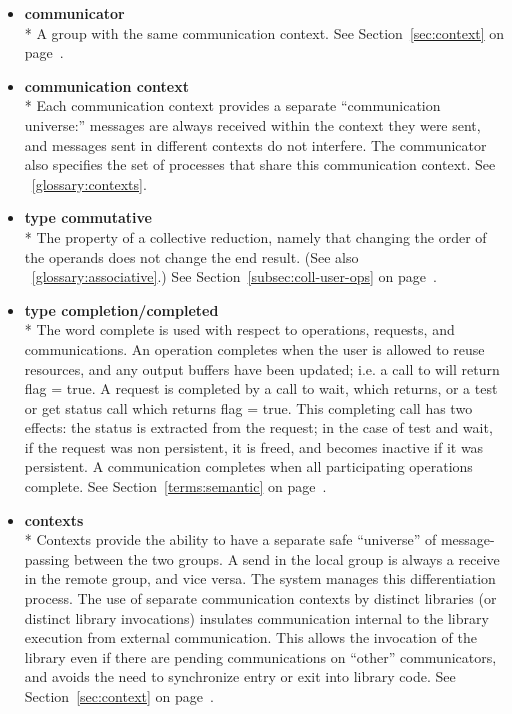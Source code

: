 \begin{itemize}
\label{glossary:communicator}
\item \textbf{ communicator} \\*
A group with the same communication context.
 See Section~\ref{sec:context} on page~\pageref{sec:context}.

\label{glossary:communication context}
\item \textbf{ communication context} \\*
Each communication context provides a separate ``communication
universe:'' messages are always received within the context they were
sent, and messages sent in different contexts do not interfere.
The communicator also specifies the set of processes that share this
communication context.
See ~\ref{glossary:contexts}.

\label{glossary:commutative}
\item \textbf{ type commutative} \\*
The property of a collective reduction, namely that changing the order of the operands does not change the end result. 
(See also ~\ref{glossary:associative}.)
See Section~\ref{subsec:coll-user-ops} on page~\pageref{subsec:coll-user-ops}.

\label{glossary:completion/completed}
\item \textbf{ type completion/completed} \\*
The word complete is used with respect to operations, requests, and communications. 
An operation completes when the user is allowed to reuse resources, and any output 
buffers have been updated; i.e. a call to  will return flag = true. A request is 
completed by a call to wait, which returns, or a test or get status call which returns flag = true. 
This completing call has two effects: the status is extracted from the request; in the case 
of test and wait, if the request was non persistent, it is freed, and becomes inactive if it 
was persistent. A communication completes when all participating operations complete.
See Section~\ref{terms:semantic} on page~\pageref{terms:semantic}.


\label{glossary:contexts}
\item \textbf{ contexts} \\*
Contexts provide the ability to have
a separate safe ``universe''
of message-passing between the two groups.  A send in the local
group is always a receive in the remote group, and vice versa.
The system manages this differentiation process.
The use of separate communication
contexts by distinct libraries (or distinct library invocations)
insulates communication internal to the library execution from
external communication.  This allows the invocation of the library even if
there are pending communications
on ``other'' communicators, and avoids the need to
synchronize entry or exit into library 
code.
See Section~\ref{sec:context} on page~\pageref{sec:context}.


\end{itemize}

